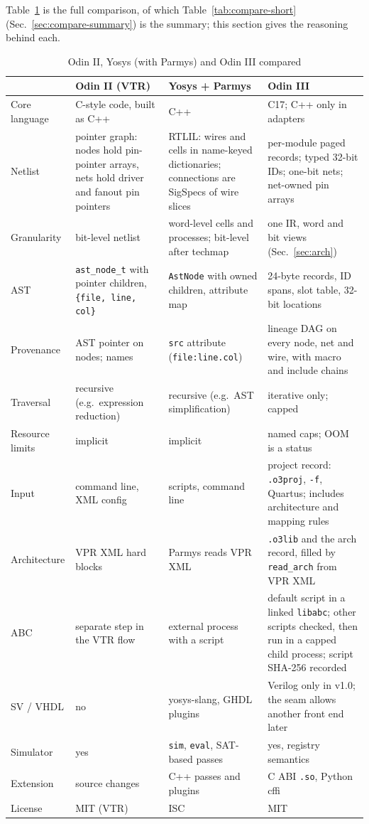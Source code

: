 \documentclass[conference]{IEEEtran}
\newcommand{\code}[1]{\texttt{#1}}
\begin{document}
Table~\ref{tab:compare} is the full comparison, of which Table~\ref{tab:compare-short} (Sec.~\ref{sec:compare-summary}) is the summary; this section
gives the reasoning behind each.

\begin{table}[!tp]
\caption{Odin II, Yosys (with Parmys) and Odin III compared}
\label{tab:compare}
\centering
\footnotesize
\begin{tabular}{@{}p{}p{}p{}p{}@{}}
\toprule
 & Odin II (VTR) & Yosys + Parmys & Odin III \\
\midrule
Core language & C-style code, built as C++ & C++ & C17; C++ only in adapters \\
Netlist & pointer graph: nodes hold pin-pointer arrays, nets hold driver and fanout pin pointers &
  RTLIL: wires and cells in name-keyed dictionaries; connections are SigSpecs of wire slices &
  per-module paged records; typed 32-bit IDs; one-bit nets; net-owned pin arrays \\
Granularity & bit-level netlist & word-level cells and processes; bit-level after techmap &
  one IR, word and bit views (Sec.~\ref{sec:arch}) \\
AST & \code{ast\_node\_t} with pointer children, \code{\{file, line, col\}} & \code{AstNode}
  with owned children, attribute map & 24-byte records, ID spans, slot table, 32-bit locations \\
Provenance & AST pointer on nodes; names & \code{src} attribute (\code{file:line.col}) &
  lineage DAG on every node, net and wire, with macro and include chains \\
Traversal & recursive (e.g.\ expression reduction) & recursive (e.g.\ AST simplification) & iterative only; capped \\
Resource limits & implicit & implicit & named caps; OOM is a status \\
Input & command line, XML config & scripts, command line & project record: \code{.o3proj},
  \code{-f}, Quartus; includes architecture and mapping rules \\
Architecture & VPR XML hard blocks & Parmys reads VPR XML & \code{.o3lib} and the arch record, filled by \code{read\_arch} from VPR XML \\
ABC & separate step in the VTR flow & external process with a script & default script in a
  linked \code{libabc}; other scripts checked, then run in a capped child process; script
  SHA-256 recorded \\
SV / VHDL & no & yosys-slang, GHDL plugins & Verilog only in v1.0; the seam allows another front end later \\
Simulator & yes & \code{sim}, \code{eval}, SAT-based passes & yes, registry semantics \\
Extension & source changes & C++ passes and plugins & C ABI \code{.so}, Python cffi \\
License & MIT (VTR) & ISC & MIT \\
\bottomrule
\end{tabular}
\end{table}
\end{document}
